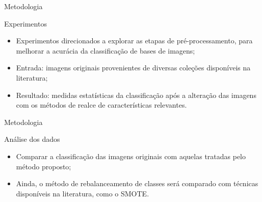 \documentclass{beamer}
\begin{document}
\begin{frame}{Metodologia}
\setlength\leftmargini{1em}
\begin{block}{Experimentos}
\justifying
\begin{itemize}
\item Experimentos direcionados a explorar as etapas de pré-processamento, para melhorar a acurácia da classificação de bases de imagens;
\item Entrada: imagens originais provenientes de diversas coleções disponíveis na literatura;
\item Resultado: medidas estatísticas da classificação após a alteração das imagens com os métodos de realce de características relevantes.
\end{itemize}
\end{block}
\end{frame}
\begin{frame}{Metodologia}
\setlength\leftmargini{1em}
\begin{block}{Análise dos dados}
\justifying
\begin{itemize}
\item Comparar a classificação das imagens originais com aquelas tratadas pelo método proposto;
\item Ainda, o método de rebalanceamento de classes será comparado com técnicas disponíveis na literatura, como o SMOTE.
\end{itemize}
\end{block}
\end{frame}
\end{document}
